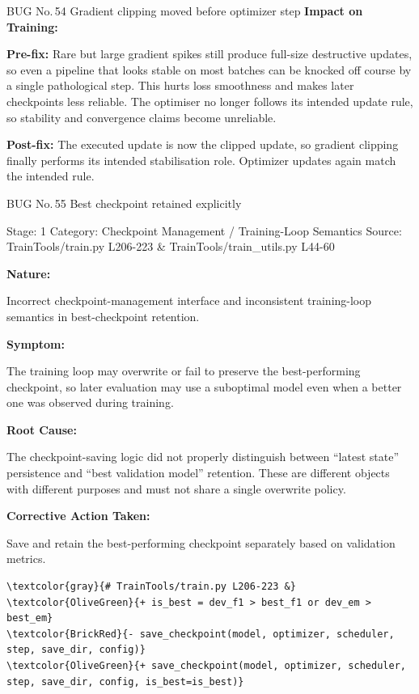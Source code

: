 \documentclass[10pt]{article}
\newcommand{\FieldLabel}[1]{%
 {\bfseries #1:}\par
}
\begin{document}
\begin{bugbox}{BUG No.\,54 \quad Gradient clipping moved before optimizer step}
\FieldLabel{Impact on Training}
\textbf{Pre-fix:} Rare but large gradient spikes still produce full-size destructive updates, so even a pipeline that looks stable on most batches can be knocked off course by a single pathological step. This hurts loss smoothness and makes later checkpoints less reliable. The optimiser no longer follows its intended update rule, so stability and convergence claims become unreliable. \par\smallskip
\textbf{Post-fix:} The executed update is now the clipped update, so gradient clipping finally performs its intended stabilisation role. Optimizer updates again match the intended rule. 
\par
\vspace{0.35em}
\end{bugbox}

\begin{bugbox}{BUG No.\,55 \quad Best checkpoint retained explicitly}
{\color{MetaGray}\small Stage: 1 \;\textbar\; Category: Checkpoint Management / Training-Loop Semantics \;\textbar\; Source: TrainTools/train.py L206-223 \& TrainTools/train\_utils.py L44-60\par}
\vspace{0.22em}
\FieldLabel{Nature}
Incorrect checkpoint-management interface and inconsistent training-loop semantics in best-checkpoint retention.
\par
\vspace{0.35em}
\FieldLabel{Symptom}
The training loop may overwrite or fail to preserve the best-performing checkpoint, so later evaluation may use a suboptimal model even when a better one was observed during training.
\par
\vspace{0.35em}
\FieldLabel{Root Cause}
The checkpoint-saving logic did not properly distinguish between ``latest state'' persistence and ``best validation model'' retention. These are different objects with different purposes and must not share a single overwrite policy.
\par
\vspace{0.35em}
\FieldLabel{Corrective Action Taken}
Save and retain the best-performing checkpoint separately based on validation metrics.
\par
\vspace{0.35em}
\begin{Verbatim}[commandchars=\\\{\},fontsize=\footnotesize,breaklines=true,breaksymbol={},frame=leftline,framerule=2pt,rulecolor=\color{gray!40},xleftmargin=6pt,formatcom=\singlespacing]
\textcolor{gray}{# TrainTools/train.py L206-223 &}
\textcolor{OliveGreen}{+ is_best = dev_f1 > best_f1 or dev_em > best_em}
\textcolor{BrickRed}{- save_checkpoint(model, optimizer, scheduler, step, save_dir, config)}
\textcolor{OliveGreen}{+ save_checkpoint(model, optimizer, scheduler, step, save_dir, config, is_best=is_best)}


\end{Verbatim}
\end{bugbox}
\end{document}
